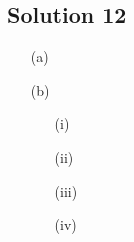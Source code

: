 \subsection*{Solution 12}

\begin{itemize}
\item[(a)]
\todo
\item[(b)]

\begin{itemize}
\item[(i)]
\todo
\item[(ii)]
\todo
\item[(iii)]
\todo
\item[(iv)]
\todo
\end{itemize}

\end{itemize}

